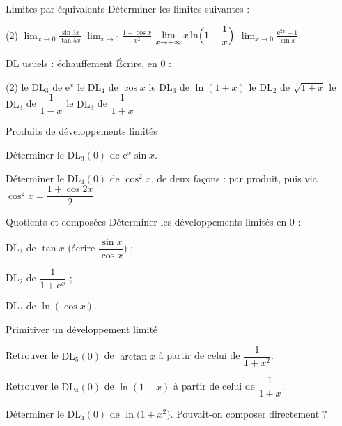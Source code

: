 \begin{exercice}[1]{Limites par équivalents}
Déterminer les limites suivantes :
\begin{tasks}(2)
  \task $\displaystyle\lim_{x\to0}\frac{\sin 3x}{\tan 5x}$
  \task $\displaystyle\lim_{x\to0}\frac{1-\cos x}{x^{2}}$
  \task $\displaystyle\lim_{x\to+\infty}x\ln\Bigl(1+\frac1x\Bigr)$
  \task $\displaystyle\lim_{x\to0}\frac{\mathrm{e}^{2x}-1}{\sin x}$
\end{tasks}
\end{exercice}

\begin{exercice}[1]{DL usuels : échauffement}
Écrire, en $0$ :
\begin{tasks}(2)
  \task le $\mathrm{DL}_{3}$ de $\mathrm{e}^{x}$
  \task le $\mathrm{DL}_{4}$ de $\cos x$
  \task le $\mathrm{DL}_{3}$ de $\ln(1+x)$
  \task le $\mathrm{DL}_{2}$ de $\sqrt{1+x}$
  \task le $\mathrm{DL}_{3}$ de $\dfrac{1}{1-x}$
  \task le $\mathrm{DL}_{3}$ de $\dfrac{1}{1+x}$
\end{tasks}
\end{exercice}

\begin{exercice}[1]{Produits de développements limités}
\begin{questions}
  \item Déterminer le $\mathrm{DL}_{3}(0)$ de $\mathrm{e}^{x}\sin x$.
  \item Déterminer le $\mathrm{DL}_{4}(0)$ de $\cos^{2}x$, de deux façons :
    par produit, puis via $\cos^{2}x=\dfrac{1+\cos 2x}{2}$.
\end{questions}
\end{exercice}

\begin{exercice}[1]{Quotients et composées}
Déterminer les développements limités en $0$ :
\begin{questions}
  \item $\mathrm{DL}_{3}$ de $\tan x$ (écrire $\dfrac{\sin x}{\cos x}$) ;
  \item $\mathrm{DL}_{2}$ de $\dfrac{1}{1+\mathrm{e}^{x}}$ ;
  \item $\mathrm{DL}_{3}$ de $\ln(\cos x)$.
\end{questions}
\end{exercice}

\begin{exercice}[1]{Primitiver un développement limité}
\begin{questions}
  \item Retrouver le $\mathrm{DL}_{5}(0)$ de $\arctan x$ à partir de celui
    de $\dfrac{1}{1+x^{2}}$.
  \item Retrouver le $\mathrm{DL}_{4}(0)$ de $\ln(1+x)$ à partir de celui
    de $\dfrac{1}{1+x}$.
  \item Déterminer le $\mathrm{DL}_{4}(0)$ de $\ln\bigl(1+x^{2}\bigr)$. Pouvait-on
    composer directement ?
\end{questions}
\end{exercice}


